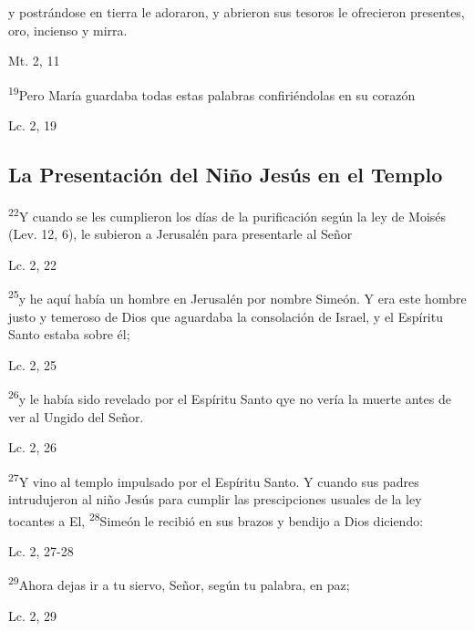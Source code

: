 \documentclass[a4paper,11pt]{article}
\begin{document}
      y postrándose en tierra le adoraron, y abrieron sus tesoros le ofrecieron presentes, oro, incienso y mirra.
      \begin{flushright}
        Mt. 2, 11         
      \end{flushright}      
      
      \textsuperscript{19}Pero María guardaba todas estas palabras confiriéndolas en su corazón
      \begin{flushright}
        Lc. 2, 19        
      \end{flushright}
            
    \subsection*{\hfil La Presentación del Niño Jesús en el Templo \hfil}
      
      \textsuperscript{22}Y cuando se les cumplieron los días de la purificación según la ley de Moisés (Lev. 12, 6), le subieron a Jerusalén para presentarle al Señor
      \begin{flushright}
        Lc. 2, 22         
      \end{flushright}
      
      \textsuperscript{25}y he aquí había un hombre en Jerusalén por nombre Simeón. Y era este hombre justo y temeroso de Dios que aguardaba la consolación de Israel, 
      y el Espíritu Santo estaba sobre él;
      \begin{flushright}
        Lc. 2, 25         
      \end{flushright}
      
      \textsuperscript{26}y le había sido revelado por el Espíritu Santo qye no vería la muerte antes de ver al Ungido del Señor.
      \begin{flushright}
        Lc. 2, 26       
      \end{flushright}
      
      \textsuperscript{27}Y vino al templo impulsado por el Espíritu Santo. Y cuando sus padres intrudujeron al niño Jesús para cumplir las prescipciones usuales
      de la ley tocantes a El, \textsuperscript{28}Simeón le recibió en sus brazos y bendijo a Dios diciendo:
      \begin{flushright}
        Lc. 2, 27-28         
      \end{flushright}
      
      \textsuperscript{29}Ahora dejas ir a tu siervo, Señor, según tu palabra, en paz;
      \begin{flushright}
        Lc. 2, 29        
      \end{flushright}
\end{document}
